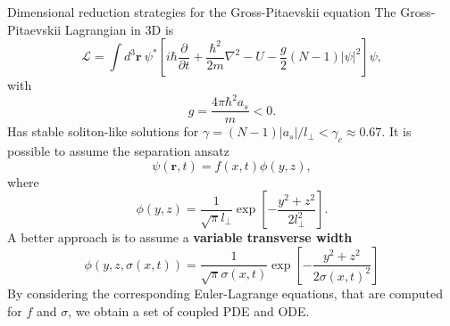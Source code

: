 \documentclass[final]{beamer}
\newlength{\colwidth}
\begin{document}
\begin{frame}[t]
\begin{columns}[t]
\begin{column}{\colwidth}
\begin{exampleblock}{Dimensional reduction strategies for the Gross-Pitaevskii equation}{}
        The Gross-Pitaevskii Lagrangian in 3D is 
        \begin{equation}\label{eq:3dlagrangian}
        \mathcal{L}= \int d^3 \mathbf{r} \ \psi^* \left[i \hbar \frac{\partial}{\partial t}+\frac{\hbar^2}{2 m} \nabla^2-U-\frac{g}{2}(N-1)|\psi|^2 \right] \psi,
        \end{equation}
        with   
        \begin{equation}
          g = \frac{4\pi \hbar^2 a_s}{m}<0.
        \end{equation}
        Has stable soliton-like solutions for $\gamma = (N-1) |a_s|/l_\perp<\gamma_c \approx 0.67$.
        It is possible to assume the separation ansatz
        \begin{equation}\label{eq:1dansats}
          \psi(\mathbf{r}, t) = f(x, t) \phi(y, z),
        \end{equation}
        where
        \begin{equation}
            \phi(y, z) = \dfrac{1}{\sqrt{\pi} l_\perp} \exp\left[-\frac{y^2+z^2}{2l_\perp^2}\right].
        \end{equation}
        A better approach is to assume a \textbf{variable transverse width} 
        \begin{equation}\label{eq:npseansatz}
            \phi(y, z, \sigma(x, t)) = \dfrac{1}{\sqrt{\pi} \sigma(x, t)} \exp\left[-\frac{y^2+z^2}{2\sigma(x, t)^2}\right]
        \end{equation}
        By considering the corresponding Euler-Lagrange equations, that are computed for $f$ and $\sigma$, we obtain a set of coupled PDE and ODE.
      \end{exampleblock}


\end{column}
\end{columns}
\end{frame}
\end{document}

